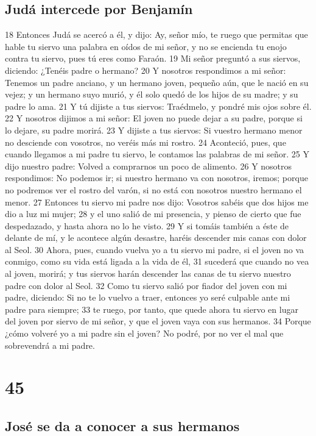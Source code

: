 \section{Judá intercede por Benjamín}

18 Entonces Judá se acercó a él, y dijo: Ay, señor mío, te ruego que permitas que hable tu siervo una palabra en oídos de mi señor, y no se encienda tu enojo contra tu siervo, pues tú eres como Faraón.
19 Mi señor preguntó a sus siervos, diciendo: ¿Tenéis padre o hermano?
20 Y nosotros respondimos a mi señor: Tenemos un padre anciano, y un hermano joven, pequeño aún, que le nació en su vejez; y un hermano suyo murió, y él solo quedó de los hijos de su madre; y su padre lo ama.
21 Y tú dijiste a tus siervos: Traédmelo, y pondré mis ojos sobre él.
22 Y nosotros dijimos a mi señor: El joven no puede dejar a su padre, porque si lo dejare, su padre morirá.
23 Y dijiste a tus siervos: Si vuestro hermano menor no desciende con vosotros, no veréis más mi rostro.
24 Aconteció, pues, que cuando llegamos a mi padre tu siervo, le contamos las palabras de mi señor.
25 Y dijo nuestro padre: Volved a comprarnos un poco de alimento.
26 Y nosotros respondimos: No podemos ir; si nuestro hermano va con nosotros, iremos; porque no podremos ver el rostro del varón, si no está con nosotros nuestro hermano el menor.
27 Entonces tu siervo mi padre nos dijo: Vosotros sabéis que dos hijos me dio a luz mi mujer;
28 y el uno salió de mi presencia, y pienso de cierto que fue despedazado, y hasta ahora no lo he visto.
29 Y si tomáis también a éste de delante de mí, y le acontece algún desastre, haréis descender mis canas con dolor al Seol.
30 Ahora, pues, cuando vuelva yo a tu siervo mi padre, si el joven no va conmigo, como su vida está ligada a la vida de él,
31 sucederá que cuando no vea al joven, morirá; y tus siervos harán descender las canas de tu siervo nuestro padre con dolor al Seol.
32 Como tu siervo salió por fiador del joven con mi padre, diciendo: Si no te lo vuelvo a traer, entonces yo seré culpable ante mi padre para siempre;
33 te ruego, por tanto, que quede ahora tu siervo en lugar del joven por siervo de mi señor, y que el joven vaya con sus hermanos.
34 Porque ¿cómo volveré yo a mi padre sin el joven? No podré, por no ver el mal que sobrevendrá a mi padre.

\chapter{45}

\section{José se da a conocer a sus hermanos}

